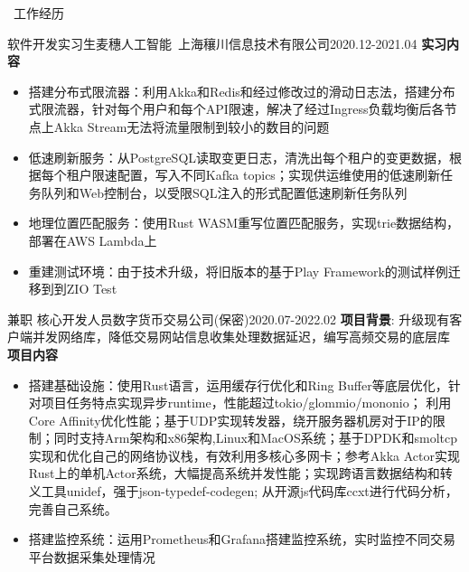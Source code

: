 \documentclass[UTF8]{resume}
\begin{document}
\begin{rSection}{\faBriefcase~工作经历}
    \begin{rExperience}{软件开发实习生}{麦穗人工智能~上海穰川信息技术有限公司}{2020.12-2021.04}
        \textbf{实习内容}
        \begin{itemize}
            \itemsep -0.5em \vspace{-0.5em}
            \item 搭建分布式限流器：利用Akka和Redis和经过修改过的滑动日志法，搭建分布式限流器，针对每个用户和每个API限速，解决了经过Ingress负载均衡后各节点上Akka Stream无法将流量限制到较小的数目的问题
            \item 低速刷新服务：从PostgreSQL读取变更日志，清洗出每个租户的变更数据，根据每个租户限速配置，写入不同Kafka topics；实现供运维使用的低速刷新任务队列和Web控制台，以受限SQL注入的形式配置低速刷新任务队列
            \item 地理位置匹配服务：使用Rust WASM重写位置匹配服务，实现trie数据结构，部署在AWS Lambda上
            \item 重建测试环境：由于技术升级，将旧版本的基于Play Framework的测试样例迁移到到ZIO Test
        \end{itemize}
    \end{rExperience}
    \begin{rExperience}{兼职 核心开发人员}{数字货币交易公司(保密)}{2020.07-2022.02}
        \textbf{项目背景}:
        升级现有客户端并发网络库，降低交易网站信息收集处理数据延迟，编写高频交易的底层库\\
        \textbf{项目内容}
        \begin{itemize}
            \itemsep -0.5em \vspace{-0.5em}
            \item 搭建基础设施：使用Rust语言，运用缓存行优化和Ring Buffer等底层优化，针对项目任务特点实现异步runtime，性能超过tokio/glommio/mononio； 利用Core Affinity优化性能；基于UDP实现转发器，绕开服务器机房对于IP的限制；同时支持Arm架构和x86架构,Linux和MacOS系统；基于DPDK和smoltcp实现和优化自己的网络协议栈，有效利用多核心多网卡；参考Akka Actor实现Rust上的单机Actor系统，大幅提高系统并发性能；实现跨语言数据结构和转义工具unidef，强于json-typedef-codegen; 从开源js代码库ccxt进行代码分析，完善自己系统。
            \item 搭建监控系统：运用Prometheus和Grafana搭建监控系统，实时监控不同交易平台数据采集处理情况

\end{itemize}
\end{rExperience}
\end{rSection}
\end{document}
